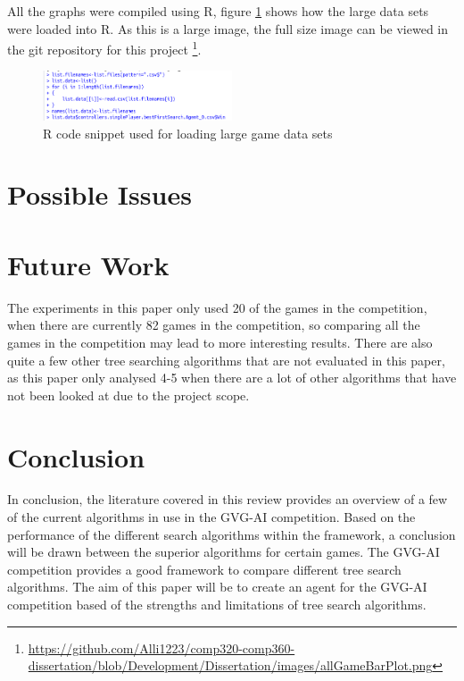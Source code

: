 \documentclass[journal]{IEEEtran}
\begin{document}
	All the graphs were compiled using R, figure \ref{fig:croppedR1} shows how the large data sets were loaded into R. As this is a large image, the full size image can be viewed in the git repository for this project \footnote{\url{https://github.com/Alli1223/comp320-comp360-dissertation/blob/Development/Dissertation/images/allGameBarPlot.png}}.

	\begin{figure}[h]
		    \centering
		    \includegraphics[width=0.5\textwidth]{croppedR1}
		    \caption{ R code snippet used for loading large game data sets }
		    \label{fig:croppedR1}
		\end{figure}












\section{Possible Issues}









\section{Future Work}

The experiments in this paper only used 20 of the games in the competition, when there are currently 82 games in the competition, so comparing all the games in the competition may lead to more interesting results.
There are also quite a few other tree searching algorithms that are not evaluated in this paper, as this paper only analysed 4-5 when there are a lot of other algorithms that have not been looked at due to the project scope.



\section{Conclusion}
	In conclusion, the literature covered in this review provides an overview of a few of the current algorithms in use in the GVG-AI competition.
	Based on the performance of the different search algorithms within the framework, a conclusion will be drawn between the superior algorithms for certain games.
	The GVG-AI competition provides a good framework to compare different tree search algorithms. 
	The aim of this paper will be to create an agent for the GVG-AI competition based of the strengths and limitations of tree search algorithms.
	 
\end{document}
